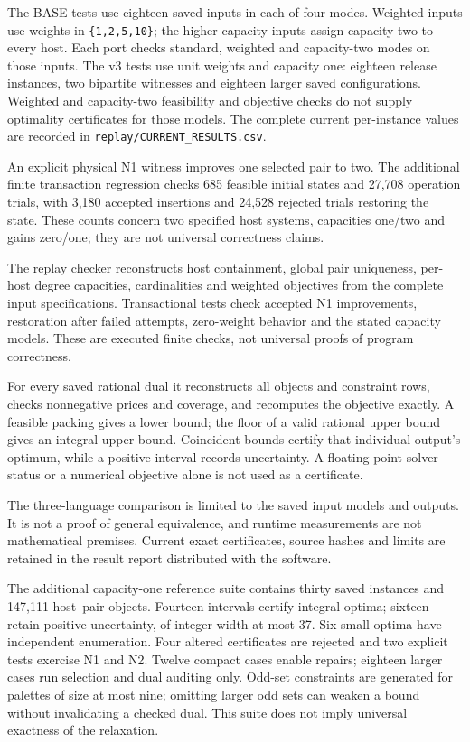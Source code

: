 \documentclass[english,11pt,a4paper]{article}
\begin{document}
The BASE tests use eighteen saved inputs in each of four modes. Weighted
inputs use weights in \texttt{\{1,2,5,10\}}; the higher-capacity inputs
assign capacity two to every host. Each port checks standard, weighted
and capacity-two modes on those inputs. The v3 tests use unit weights
and capacity one: eighteen release instances, two bipartite witnesses
and eighteen larger saved configurations. Weighted and capacity-two
feasibility and objective checks do not supply optimality certificates
for those models. The complete current per-instance values are recorded
in \nolinkurl{replay/CURRENT_RESULTS.csv}.

An explicit physical N1 witness improves one selected pair to two. The
additional finite transaction regression checks 685 feasible initial
states and 27,708 operation trials, with 3,180 accepted insertions and
24,528 rejected trials restoring the state. These counts concern two
specified host systems, capacities one/two and gains zero/one; they are
not universal correctness claims.

The replay checker reconstructs host containment, global pair
uniqueness, per-host degree capacities, cardinalities and weighted
objectives from the complete input specifications. Transactional tests
check accepted N1 improvements, restoration after failed attempts,
zero-weight behavior and the stated capacity models. These are executed
finite checks, not universal proofs of program correctness.

For every saved rational dual it reconstructs all objects and constraint
rows, checks nonnegative prices and coverage, and recomputes the
objective exactly. A feasible packing gives a lower bound; the floor of
a valid rational upper bound gives an integral upper bound. Coincident
bounds certify that individual output's optimum, while a positive
interval records uncertainty. A floating-point solver status or a
numerical objective alone is not used as a certificate.

The three-language comparison is limited to the saved input models and
outputs. It is not a proof of general equivalence, and runtime
measurements are not mathematical premises. Current exact certificates,
source hashes and limits are retained in the result report distributed
with the software.

The additional capacity-one reference suite contains thirty saved
instances and 147,111 host--pair objects. Fourteen intervals certify
integral optima; sixteen retain positive uncertainty, of integer width
at most 37. Six small optima have independent enumeration. Four altered
certificates are rejected and two explicit tests exercise N1 and N2.
Twelve compact cases enable repairs; eighteen larger cases run selection
and dual auditing only. Odd-set constraints are generated for palettes
of size at most nine; omitting larger odd sets can weaken a bound
without invalidating a checked dual. This suite does not imply universal
exactness of the relaxation.
\end{document}

